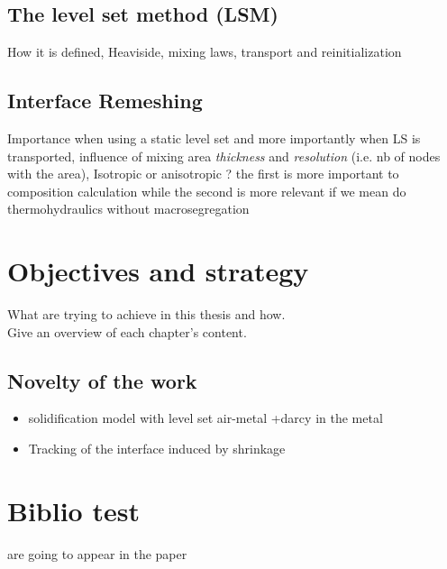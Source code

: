 \subsection{The level set method (LSM)}
How it is defined, Heaviside, mixing laws, transport and reinitialization
\subsection{Interface Remeshing}
Importance when using a static level set and more importantly when LS is transported,
influence of mixing area \emph{thickness} and \emph{resolution} (i.e. nb of nodes with the area),
Isotropic or anisotropic ? the first is more important to composition calculation while the second
is more relevant if we mean do thermohydraulics without macrosegregation

\section{Objectives and strategy}
What are trying to achieve in this thesis and how. \\
Give an overview of each chapter's content.

\subsection*{Novelty of the work}
\begin{itemize}
\item solidification model with level set air-metal +darcy in the metal
\item Tracking of the interface induced by shrinkage
\end{itemize}

\section{Biblio test}
\cite{carozzani_direct_2013} are going to appear in the paper 